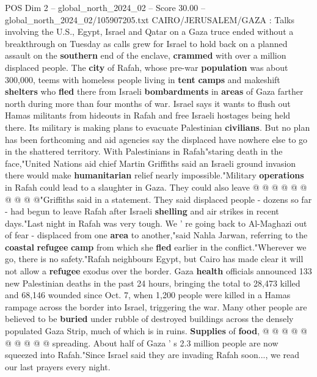 \begin{textsample}{POS Dim 2 – global\_north\_2024\_02 – Score 30.00 – global\_north\_2024\_02/105907205.txt}  \label{ex:f2_pos_149}
CAIRO/JERUSALEM/GAZA : Talks involving the U.S., Egypt, Israel and Qatar on a Gaza truce ended without a breakthrough on Tuesday as calls grew for Israel to hold back on a planned assault on the \textbf{southern} end of the enclave, \textbf{crammed} with over a million displaced people.
The \textbf{city} of Rafah, whose pre-war \textbf{population} was about 300,000, teems with homeless people living in \textbf{tent} \textbf{camps} and makeshift \textbf{shelters} who \textbf{fled} there from Israeli \textbf{bombardments} in \textbf{areas} of Gaza farther north during more than four months of war.
Israel says it wants to flush out Hamas militants from hideouts in Rafah and free Israeli hostages being held there.
Its military is making plans to evacuate Palestinian \textbf{civilians}.
But no plan has been forthcoming and aid agencies say the displaced have nowhere else to go in the shattered territory.
With Palestinians in Rafah"staring death in the face,"United Nations aid chief Martin Griffiths said an Israeli ground invasion there would make \textbf{humanitarian} relief nearly impossible."Military \textbf{operations} in Rafah could lead to a slaughter in Gaza.
They could also leave @ @ @ @ @ @ @ @ @ @"Griffiths said in a statement.
They said displaced people - dozens so far - had begun to leave Rafah after Israeli \textbf{shelling} and air strikes in recent days."Last night in Rafah was very tough.
We ' re going back to Al-Maghazi out of fear - displaced from one \textbf{area} to another,"said Nahla Jarwan, referring to the \textbf{coastal} \textbf{refugee} \textbf{camp} from which she \textbf{fled} earlier in the conflict."Wherever we go, there is no safety."Rafah neighbours Egypt, but Cairo has made clear it will not allow a \textbf{refugee} exodus over the border.
Gaza \textbf{health} officials announced 133 new Palestinian deaths in the past 24 hours, bringing the total to 28,473 killed and 68,146 wounded since Oct. 7, when 1,200 people were killed in a Hamas rampage across the border into Israel, triggering the war.
Many other people are believed to be \textbf{buried} under rubble of destroyed buildings across the densely populated Gaza Strip, much of which is in ruins. \textbf{Supplies} of \textbf{food}, @ @ @ @ @ @ @ @ @ @ spreading.
About half of Gaza ' s 2.3 million people are now squeezed into Rafah."Since Israel said they are invading Rafah soon..., we read our last prayers every night.

\end{textsample}
